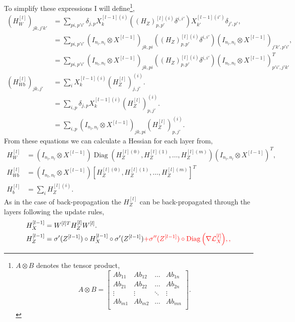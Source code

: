 \documentclass[11pt,twocolumn]{article}
\DeclareMathOperator*{\Diag}{Diag}
\begin{document}
To simplify these expressions I will define\footnote{$A \otimes B$ denotes the tensor product,
\begin{equation}
A \otimes B=\left[\begin{array}{cccc}
A b_{11} & A b_{12} & \ldots  &A b_{1n}\\
A b_{21} & A b_{22} & \ldots &A b_{2n}\\
\vdots & \vdots & \ddots &\vdots\\
A b_{m1} & A b_{m2} & \ldots &A b_{mn}\\
\end{array}
\right].
\end{equation}},
\begin{align}
(H_W^{[l]})_{jk,j'k'}&=\sum_{pi,p'i'}\delta_{j,p}X_{k}^{[l-1](i)}((H_Z)^{[l](i)}_{p,p'}\delta^{i,i'})X_{k'}^{[l-1](i')}\delta_{j',p'},\\
&=\sum_{pi,p'i'}(I_{n_l,n_l} \otimes X^{[l-1]})_{jk,pi}((H_Z)^{[l](i)}_{p,p'}\delta^{i,i'})(I_{n_l,n_l} \otimes X^{[l-1]})_{j'k',p'i'},\\
&=\sum_{pi,p'i'}(I_{n_l,n_l} \otimes X^{[l-1]})_{jk,pi}((H_Z)^{[l](i)}_{p,p'}\delta^{i,i'})(I_{n_l,n_l} \otimes X^{[l-1]})^T_{p'i',j'k'}\\
(H_{Wb}^{[l]})_{jk,j'}&=\sum_{i}X_{k}^{[l-1](i)}(H_Z^{[l]})^{(i)}_{j,j'}.\\
&=\sum_{i,p}\delta_{j,p} X_{k}^{[l-1](i)}(H_Z^{[l]})^{(i)}_{p,j'}.\\
&=\sum_{i,p}(I_{n_l,n_l} \otimes X^{[l-1]})_{jk,pi}(H_Z^{[l]})^{(i)}_{p,j'}.
\end{align} 
From these equations we can calculate a Hessian for each layer from,
\begin{align}
H_W^{[l]}&=(I_{n_l,n_l} \otimes X^{[l-1]})\Diag{(H_Z^{[l](0)},H_Z^{[l](1)},\ldots,H_Z^{[l](m)})}(I_{n_l,n_l} \otimes X^{[l-1]})^T,\label{H_W_calc}\\
H_{Wb}^{[l]}&=(I_{n_l,n_l} \otimes X^{[l-1]}) [H_Z^{[l](0)},H_Z^{[l](1)},\ldots,H_Z^{[l](m)}]^T\label{H_Wb_calc}\\
H_{b}^{[l]}&=\sum_i H_Z^{[l](i)}.\label{H_b_calc}
\end{align}
As in the case of back-propagation the $H_Z^{[l]}$ can be back-propagated through the layers following the update rules,
\begin{align}
H_X^{[l-1]}&=W^{[l]T} H_Z^{[l]}W^{[l]}.\label{H_X_backprop}\\
H_Z^{[l-1]}&=\sigma'{(Z^{[l-1]})}\circ H_X^{[l-1]} \circ \sigma'{(Z^{[l-1]})}\color{red}{+\sigma''{(Z^{[l-1]})}\circ \Diag{\left(\nabla \mathcal{L}^{[l]}_{X}\right)}},\label{H_Z_backprop},
\end{align}
\end{document}

